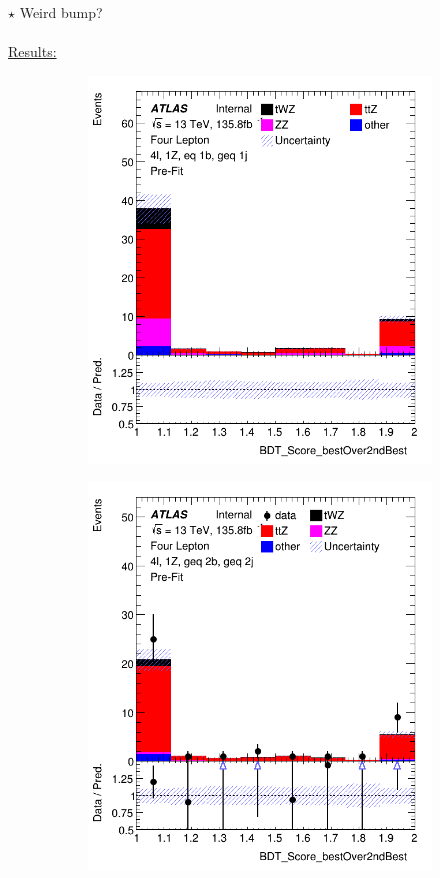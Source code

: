 \documentclass[]{article}
\begin{document}
$\star$ Weird bump?\\ \\
\underline{\large Results:}
\begin{figure}[!h]
	\begin{subfigure}[b]{0.4\textwidth}
		\includegraphics[width=\textwidth]{bdt_res_1.png}
		
	\end{subfigure}
	\begin{subfigure}[b]{0.4\textwidth}
		\includegraphics[width=\textwidth]{bdt_res_2.png}
		

\end{subfigure}
\end{figure}
\end{document}

